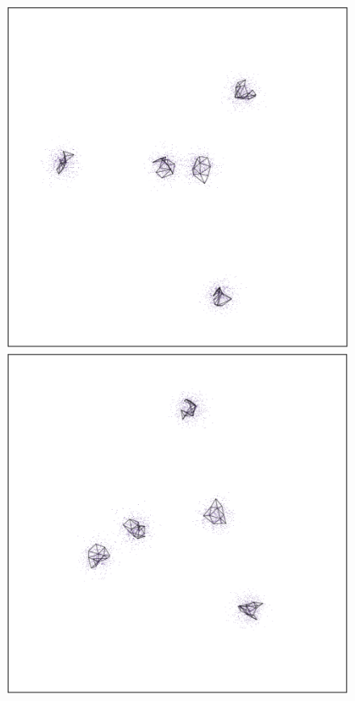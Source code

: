 \documentclass[
  12pt]{article}
\begin{document}
\begin{figure}[H]

\begin{minipage}{0.33\linewidth}
\includegraphics{figures/five_gau_clusters/sc_umap_1.png}\end{minipage}%
%
\begin{minipage}{0.33\linewidth}
\includegraphics{figures/five_gau_clusters/sc_umap_2.png}\end{minipage}%

\end{figure}
\end{document}
